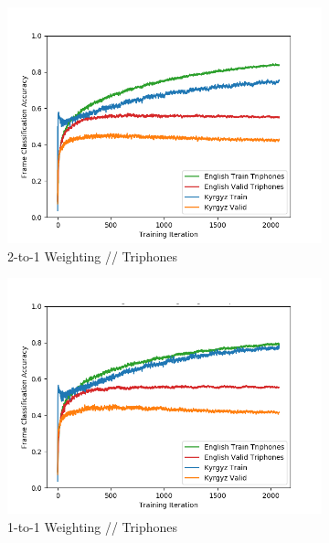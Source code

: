 \documentclass[a4paper]{article}
\begin{document}
\begin{figure}[!htbp]
\begin{subfigure}{.3\textwidth}
  \centering
  \includegraphics[width=1\textwidth,keepaspectratio]{figs-1/1-to-2-tri.png}
  \caption{2-to-1 Weighting // Triphones}
  \label{fig:sub1}
\end{subfigure}%
\begin{subfigure}{.3\textwidth}
  \centering
  \includegraphics[width=1\textwidth,keepaspectratio]{figs-1/1-to-1-tri.png}
  \caption{1-to-1 Weighting // Triphones}
  \label{fig:sub2}
\end{subfigure}%
\begin{subfigure}{.3\textwidth}
  \centering

\end{subfigure}
\end{figure}
\end{document}
